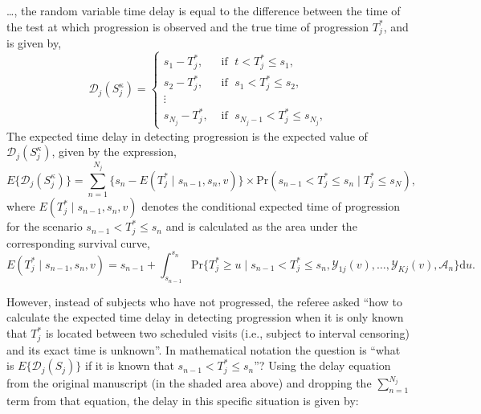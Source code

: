 \begin{enumerate}
\begin{shadequote}
\ldots, the random variable time delay is equal to the difference between the time of the test at which progression is observed and the true time of progression $T_j^*$, and is given by,
\[
\mathcal D_j (S^\kappa_j) = \left \{
\begin{array}{ll}
s_1 - T_j^*, & \mbox{ if } \; t < T^*_j \leq s_1,\\
s_2 - T_j^*, & \mbox{ if } \; s_1 < T^*_j \leq s_2,\\
\vdots&\\
s_{N_j} - T_j^*, & \mbox{ if } \; s_{N_j-1} < T^*_j \leq s_{N_j},
\end{array}
\right.
\]
The expected time delay in detecting progression is the expected value of $\mathcal D_j (S^\kappa_j)$, given by the expression,
\begin{equation*}
E \big \{ \mathcal D_j(S^\kappa_j)\big\} = \sum_{n = 1}^{N_j} \Big\{s_n - E(T^*_j \mid s_{n-1}, s_n, v)\Big\} \times \mbox{Pr}(s_{n-1} < T^*_j \leq s_n\mid T^*_j \leq s_N),
\end{equation*}
where $E(T^*_j \mid s_{n-1}, s_n, v)$ denotes the conditional expected time of progression for the scenario $s_{n-1} < T^*_j \leq s_n$ and is calculated as the area under the corresponding survival curve,
\begin{equation*}
E(T^*_j \mid s_{n-1}, s_n, v) = s_{n-1} + \int_{s_{n-1}}^{s_n} \mbox{Pr}\Big\{T^*_j \geq u \mid s_{n-1} < T^*_j \leq s_n, \mathcal{Y}_{1j}(v), \ldots, \mathcal{Y}_{Kj}(v), \mathcal{A}_n\Big\} \mathrm{d}u.
\end{equation*}
\end{shadequote}

However, instead of subjects who have not progressed, the referee asked ``how to calculate the expected time delay in detecting progression when it is only known that $T^*_j$ is located between two scheduled visits (i.e., subject to interval censoring) and its exact time is unknown''. In mathematical notation the question is ``what is $E \big \{ \mathcal D_j(S_j)\big\}$ if it is known that $s_{n-1} < T^*_j \leq s_n$''? Using the delay equation from the original manuscript (in the shaded area above) and dropping the $\sum_{n = 1}^{N_j}$ term from that equation, the delay in this specific situation is given by:


\end{enumerate}
